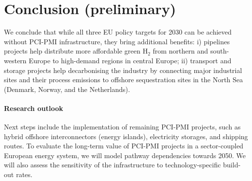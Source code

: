 \documentclass[10pt]{article}
\begin{document}
\section*{Conclusion (preliminary)}
We conclude that while all three EU policy targets for 2030 can be achieved without PCI-PMI infrastructure, they bring additional benefits: i)  pipelines projects help distribute more affordable green H$_2$ from northern and south-western Europe to high-demand regions in central Europe; ii)  transport and storage projects help decarbonising the industry by connecting major industrial sites and their process emissions to offshore sequestration sites in the North Sea (Denmark, Norway, and the Netherlands).

\paragraph{Research outlook} Next steps include the implementation of remaining PCI-PMI projects, such as hybrid offshore interconnectors (energy islands), electricity storages, and  shipping routes. To evaluate the long-term value of PCI-PMI projects in a sector-coupled European energy system, we will model pathway dependencies towards 2050. We will also assess the sensitivity of the infrastructure to technology-specific build-out rates.




\end{document}
